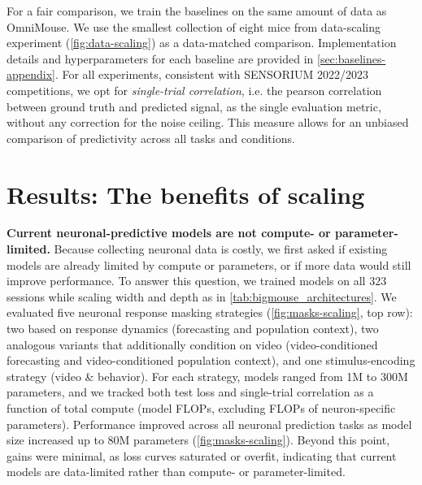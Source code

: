 \documentclass{article} %
\begin{document}
For a fair comparison, we train the baselines on the same amount of data as OmniMouse. We use the smallest collection of eight mice from data-scaling experiment (\cref{fig:data-scaling}) as a data-matched comparison.
Implementation details and hyperparameters for each baseline are provided in \cref{sec:baselines-appendix}.
For all experiments, consistent with SENSORIUM 2022/2023 competitions, we opt for \textit{single-trial correlation}, i.e. the pearson correlation between ground truth and predicted signal, as the single evaluation metric, without any correction for the noise ceiling. This measure allows for an unbiased comparison of predictivity across all tasks and conditions.

\section{Results: The benefits of scaling}
\textbf{Current neuronal-predictive models are not compute- or parameter-limited.} 
Because collecting neuronal data is costly, we first asked if existing models are already limited by compute or parameters, or if more data would still improve performance. 
To answer this question, we trained models on all 323 sessions while scaling width and depth as in \cref{tab:bigmouse_architectures}. 
We evaluated five neuronal response masking strategies (\cref{fig:masks-scaling}, top row): two based on response dynamics (forecasting and population context), two analogous variants that additionally condition on video (video-conditioned forecasting and video-conditioned population context), and one stimulus-encoding strategy (video \& behavior). 
For each strategy, models ranged from 1M to 300M parameters, and we tracked both test loss and single-trial correlation as a function of total compute (model FLOPs, excluding FLOPs of neuron-specific parameters). 
Performance improved across all neuronal prediction tasks as model size increased up to 80M parameters (\cref{fig:masks-scaling}). 
Beyond this point, gains were minimal, as loss curves saturated or overfit, indicating that current models are data-limited rather than compute- or parameter-limited.
\end{document}
